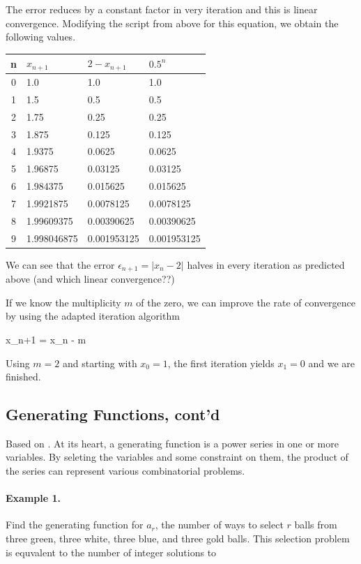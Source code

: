 The error reduces by a constant factor in very iteration and this is linear convergence. Modifying the script from above for this equation, we obtain the following values.

\vspace*{3mm}

\begin{tabular}{c|lll} \hline
n & $x_{n+1}$ &  $2 - x_{n+1}$ & $0.5^n$ \\ \hline
0 & 1.0 & 1.0 & 1.0 \\
1 & 1.5 & 0.5 & 0.5 \\
2 & 1.75 & 0.25 & 0.25 \\
3 & 1.875 & 0.125 & 0.125 \\
4 & 1.9375 & 0.0625 & 0.0625 \\
5 & 1.96875 & 0.03125 & 0.03125 \\
6 & 1.984375 & 0.015625 & 0.015625 \\
7 & 1.9921875 & 0.0078125 & 0.0078125 \\
8 & 1.99609375 & 0.00390625 & 0.00390625 \\
9 & 1.998046875 & 0.001953125 & 0.001953125
\end{tabular}

\vspace*{3mm}

We can see that the error $\epsilon_{n+1} = |x_n - 2|$ halves in every iteration as predicted above (and which linear convergence??)

If we know the multiplicity $m$ of the zero, we can improve the rate of convergence by using the adapted iteration algorithm

\bee
x_{n+1} = x_n - m 
\eee

Using $m=2$ and starting with $x_0=1$, the first iteration yields $x_1 = 0$ and we are finished.


\subsection{Generating Functions, cont'd}

Based on \cite{tucker2012appliedcombinatoris}.  At its heart, a generating function is a power series in one or more variables. By seleting the variables and some constraint on them, the product of the series can represent various combinatorial problems.

\paragraph{Example 1.} Find the generating function for $a_r$, the number of ways to select $r$ balls from three green, three white, three blue, and three gold balls. This selection problem is equvalent to the number of integer solutions to


